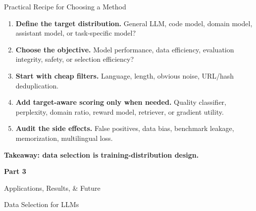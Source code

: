 \documentclass[aspectratio=169]{beamer}
\begin{document}
\begin{frame}{Practical Recipe for Choosing a Method}

\begin{enumerate}
  \item \textbf{Define the target distribution.}
  General LLM, code model, domain model, assistant model, or task-specific model?

  \item \textbf{Choose the objective.}
  Model performance, data efficiency, evaluation integrity, safety, or selection efficiency?

  \item \textbf{Start with cheap filters.}
  Language, length, obvious noise, URL/hash deduplication.

  \item \textbf{Add target-aware scoring only when needed.}
  Quality classifier, perplexity, domain ratio, reward model, retriever, or gradient utility.

  \item \textbf{Audit the side effects.}
  False positives, data bias, benchmark leakage, memorization, multilingual loss.
\end{enumerate}

\vspace{0.6em}

\begin{center}
\Large\color{ucrblue}\textbf{Takeaway: data selection is training-distribution design.}
\end{center}

\end{frame}





\begin{frame}

\begin{center}

\vspace{2cm}

{\color{ucrblue}\Huge\textbf{Part 3}}

\vspace{0.8cm}

{\LARGE Applications, Results, \& Future}

\vspace{1cm}

{\large Data Selection for LLMs}

\end{center}

\end{frame}
\end{document}

